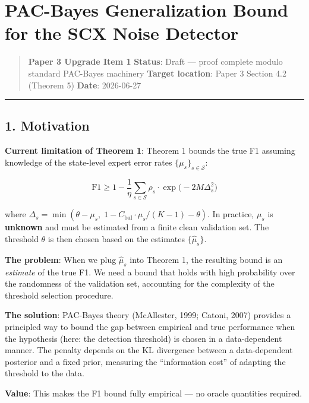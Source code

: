 \documentclass[
  12pt,
]{ctexart}
\author{SCX}
\date{2026}
\begin{document}
\section{PAC-Bayes Generalization Bound for the SCX Noise
Detector}\label{pac-bayes-generalization-bound-for-the-scx-noise-detector}

\begin{quote}
\textbf{Paper 3 Upgrade Item 1} \textbf{Status}: Draft --- proof
complete modulo standard PAC-Bayes machinery \textbf{Target location}:
Paper 3 Section 4.2 (Theorem 5) \textbf{Date}: 2026-06-27
\end{quote}

\begin{center}\rule{0.5\linewidth}{0.5pt}\end{center}

\subsection{1. Motivation}\label{motivation}

\textbf{Current limitation of Theorem 1}: Theorem 1 bounds the true F1
assuming knowledge of the state-level expert error rates
\(\{\mu_s\}_{s \in \mathcal{S}}\):

\[\text{F1} \geq 1 - \frac{1}{\eta} \sum_{s \in \mathcal{S}} \rho_s \cdot \exp\!\bigl(-2M\Delta_s^2\bigr)\]

where
\(\Delta_s = \min(\theta - \mu_s,\; 1 - C_{\text{bal}} \cdot \mu_s/(K-1) - \theta)\).
In practice, \(\mu_s\) is \textbf{unknown} and must be estimated from a
finite clean validation set. The threshold \(\theta\) is then chosen
based on the estimates \(\{\hat{\mu}_s\}\).

\textbf{The problem}: When we plug \(\hat{\mu}_s\) into Theorem 1, the
resulting bound is an \emph{estimate} of the true F1. We need a bound
that holds with high probability over the randomness of the validation
set, accounting for the complexity of the threshold selection procedure.

\textbf{The solution}: PAC-Bayes theory (McAllester, 1999; Catoni, 2007)
provides a principled way to bound the gap between empirical and true
performance when the hypothesis (here: the detection threshold) is
chosen in a data-dependent manner. The penalty depends on the KL
divergence between a data-dependent posterior and a fixed prior,
measuring the ``information cost'' of adapting the threshold to the
data.

\textbf{Value}: This makes the F1 bound fully empirical --- no oracle
quantities required.
\end{document}
